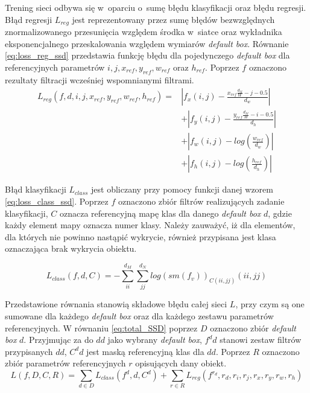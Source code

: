 Trening sieci odbywa się w~oparciu o~sumę błędu klasyfikacji oraz błędu regresji.
Błąd regresji $L_{reg}$ jest reprezentowany przez sumę błędów bezwzględnych znormalizowanego przesunięcia względem środka w~siatce oraz wykładnika eksponencjalnego przeskalowania względem wymiarów \emph{default box}. 
Równanie \eqref{eq:loss_reg_ssd} przedstawia funkcję błędu dla pojedynczego \emph{default box} dla referencyjnych parametrów $i, j, x_{ref}, y_{ref}, w_{ref}$ oraz $h_{ref}$.
Poprzez $f$ oznaczono rezultaty filtracji wcześniej wspomnianymi filtrami.
\begin{equation}
\begin{aligned}
L_{reg}(f, d, i, j, x_{ref}, y_{ref}, w_{ref}, h_{ref}) 
=& |f_x(i,j) - \frac{x_{ref}\frac{d_N}{W} - j - 0.5}{d_w}| \\
&+ |f_y(i,j) - \frac{y_{ref}\frac{d_M}{H} - i - 0.5}{d_h}| \\
&+ |f_w(i,j) - log(\frac{w_{ref}}{d_w})|\\
&+ |f_h(i,j) - log(\frac{h_{ref}}{d_h})|
\end{aligned}
\label{eq:loss_reg_ssd}
\end{equation}

Błąd klasyfikacji $L_{class}$ jest obliczany przy pomocy funkcji danej wzorem \eqref{eq:loss_class_ssd}. Poprzez $f$ oznaczono zbiór filtrów realizujących zadanie klasyfikacji, $C$ oznacza referencyjną mapę klas dla danego \emph{default box} $d$, gdzie każdy element mapy oznacza numer klasy. Należy zauważyć, iż dla elementów, dla których nie powinno nastąpić wykrycie, również przypisana jest klasa oznaczająca brak wykrycia obiektu.

\begin{equation}
L_{class}(f,d,C) = 
-\sum_{ii}^{d_M}{\sum_{jj}^{d_N}
{log(sm(f_{v}))_{C(ii,jj)}(ii,jj)}
}
\label{eq:loss_class_ssd}
\end{equation}


Przedstawione równania stanowią składowe błędu całej sieci $L$, przy czym są one sumowane dla każdego \emph{default box} oraz dla każdego zestawu parametrów referencyjnych.
W równaniu \eqref{eq:total_SSD} poprzez $D$ oznaczono zbiór \emph{default box} $d$. 
Przyjmując za do $dd$ jako wybrany \emph{default box},  $f^dd$ stanowi zestaw filtrów przypisanych $dd$, $C^dd$ jest maską referencyjną klas dla $dd$. 
Poprzez $R$ oznaczono zbiór parametrów referencyjnych $r$ opisujących dany obiekt.
\begin{equation}
    L(f, D, C, R) = \sum_{d \in D} {L_{class}(f^d,d,C^d)} + \sum_{r \in R}{L_{reg}(f^{r_d},r_d,r_i,r_j,r_x,r_y,r_w,r_h)}
\label{eq:total_SSD}
\end{equation}

